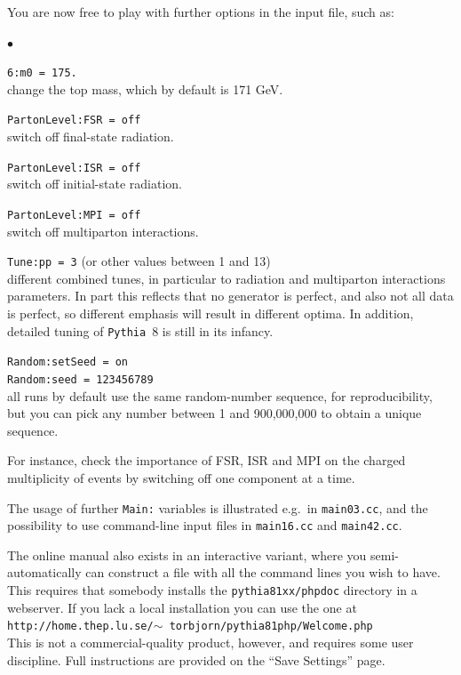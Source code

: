 \documentclass[12pt,a4paper]{article}
\newenvironment{Itemize}{\begin{list}{$\bullet$}%
{\setlength{\topsep}{0.4mm}\setlength{\partopsep}{0.4mm}%
\setlength{\itemsep}{0.4mm}\setlength{\parsep}{0.4mm}}}%
{\end{list}}
\begin{document}
You are now free to play with further options in the input file, such as:
\begin{Itemize}
\item \texttt{6:m0 = 175.}\\  
change the top mass, which by default is 171 GeV.
\item \texttt{PartonLevel:FSR = off}\\  
switch off final-state radiation.
\item \texttt{PartonLevel:ISR = off}\\  
switch off initial-state radiation.
\item \texttt{PartonLevel:MPI = off}\\
switch off multiparton interactions.  
\item \texttt{Tune:pp = 3} (or other values between 1 and 13) \\
different combined tunes, in particular to radiation and multiparton 
interactions parameters. In part this reflects that no generator 
is perfect, and also not all data is perfect, so different emphasis 
will result in different optima. In addition, detailed tuning of 
\texttt{Pythia}~8 is still in its infancy.  
\item \texttt{Random:setSeed = on}\\
\texttt{Random:seed = 123456789}\\
all runs by default use the same random-number sequence, for reproducibility,
but you can pick any number between 1 and 900,000,000 to obtain a unique
sequence.
\end{Itemize}
For instance, check the importance of FSR, ISR and MPI on the charged 
multiplicity of events by switching off one component at a time.

The usage of further \texttt{Main:} variables is illustrated e.g.\ in
\texttt{main03.cc}, and the possibility to use command-line input
files in \texttt{main16.cc} and \texttt{main42.cc}. 

The online manual also exists in an interactive variant, where you
semi-automatically can construct a file with all the command lines you
wish to have. This requires that somebody installs the 
\texttt{pythia81xx/phpdoc} directory in a webserver. If you lack a local
installation you can use the one at\\
\hspace*{10mm}\texttt{http://home.thep.lu.se/$\sim$%
torbjorn/pythia81php/Welcome.php}\\
This is not a commercial-quality product, however, and requires some
user discipline. Full instructions are provided on the ``Save Settings''
page.
\end{document}
